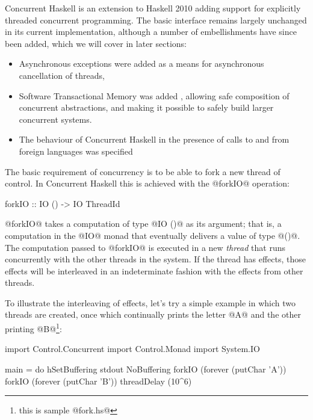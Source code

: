 
Concurrent Haskell \cite{jones96concurrent} is an extension to Haskell
2010 \cite{haskell2010} adding support for explicitly threaded
concurrent programming.  The basic interface remains largely unchanged
in its current implementation, although a number of embellishments have
since been added, which we will cover in later sections:

\begin{itemize}
\item Asynchronous exceptions \cite{spj:asynch-exceptions} were added
  as a means for asynchronous cancellation of threads,
\item Software Transactional Memory was added \cite{stm}, allowing
  safe composition of concurrent abstractions, and making it possible
  to safely build larger concurrent systems.
\item The behaviour of Concurrent Haskell in the presence of calls to
  and from foreign languages was specified \cite{conc-ffi}
\end{itemize}


The basic requirement of concurrency is to be able to fork a new
thread of control.  In Concurrent Haskell this is achieved with the
@forkIO@ operation:

\begin{haskell}
forkIO :: IO () -> IO ThreadId
\end{haskell}

\noindent @forkIO@ takes a computation of type @IO ()@ as its
argument; that is, a computation in the @IO@ monad that eventually
delivers a value of type @()@.  The computation passed to @forkIO@ is
executed in a new \emph{thread} that runs concurrently with the other
threads in the system.  If the thread has effects, those effects will
be interleaved in an indeterminate fashion with the effects from other
threads.

To illustrate the interleaving of effects, let's try a simple example
in which two threads are created, once which continually prints the
letter @A@ and the other printing @B@\footnote{this is sample @fork.hs@}:

\begin{numhaskell}
import Control.Concurrent
import Control.Monad
import System.IO

main = do
  hSetBuffering stdout NoBuffering
  forkIO (forever (putChar 'A'))
  forkIO (forever (putChar 'B'))
  threadDelay (10^6)
\end{numhaskell}

